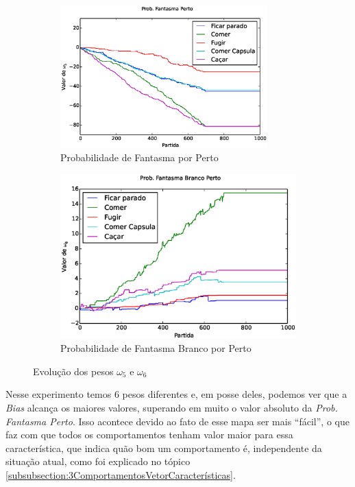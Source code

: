 \begin{figure}[H]
	\centering
	\begin{subfigure}[t]{.5\textwidth}
		\centering
		\includegraphics[width=80mm]{images/5_behaviors_original_map/weights____pol__ProbExistirFantBranco}
		\caption{Probabilidade de Fantasma por Perto}
		\label{img:5ComportamentosMapaOriginal:PesoProbFantasmaPorPerto}
	\end{subfigure}%
	\begin{subfigure}[t]{.5\textwidth}
		\centering
		\includegraphics[width=\linewidth]{images/5_behaviors_original_map/weights____pol__ProbFantasmaPerto}
		\caption{Probabilidade de Fantasma Branco por Perto}
	\label{img:5ComportamentosMapaOriginal:PesoProbFantasmaBrancoPorPerto}
	\end{subfigure}
	\caption{Evolução dos pesos $ \omega_5 $ e $ \omega_6 $}
	\label{img:5ComportamentosMapaOriginal:PesoProbFantasmaBrancoExistirOuNormalPerto}
\end{figure}

Nesse experimento temos 6 pesos diferentes e, em posse deles, podemos ver que a \textit{Bias} alcança os maiores valores, superando em muito o valor absoluto da \textit{Prob. Fantasma Perto}. Isso acontece devido ao fato de esse mapa ser mais ``fácil'', o que faz com que todos os comportamentos tenham valor maior para essa característica, que indica quão bom um comportamento é, independente da situação atual, como foi explicado no tópico \ref{subsubsection:3ComportamentosVetorCaracterísticas}.

